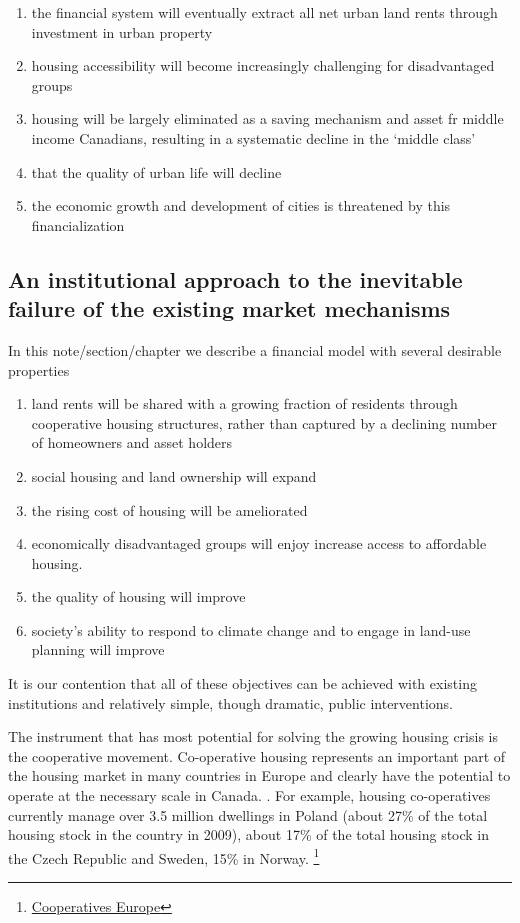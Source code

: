 \begin{enumerate}
\item the financial system will eventually extract all net urban land rents through investment in urban property
\item housing accessibility will become increasingly challenging for disadvantaged groups
\item housing will be largely eliminated as a saving mechanism and asset fr middle income Canadians,  resulting in a systematic decline in the `middle class'
\item that the quality of urban life will decline
\item the economic growth and development of cities is threatened by this financialization
\end{enumerate}



\subsection{An institutional approach to the inevitable failure of the existing market mechanisms}

 In this note/section/chapter we describe a financial model with several desirable properties
 
 \begin{enumerate}
     \item land rents will be shared with a growing fraction of residents through cooperative housing structures, rather than captured by a declining number of homeowners and asset holders
     \item social housing and land ownership will expand
     \item the rising cost of housing will be ameliorated
     \item economically disadvantaged groups will enjoy increase access to affordable housing.
     \item the quality of housing will improve
     \item society's ability to respond to climate change and to engage in land-use planning will improve     
 \end{enumerate}


 It is our contention that all of these objectives can be achieved with existing institutions and relatively simple, though dramatic, public interventions.

 The instrument that has most potential for solving the growing housing crisis is the cooperative movement. Co-operative housing represents an important part of the housing market in many countries in Europe and clearly have the potential to operate at the necessary scale in Canada. . For example, housing co-operatives currently manage over 3.5 million dwellings in Poland (about 27\% of the total housing stock in the country in 2009), about 17\% of the total housing stock in the Czech Republic and Sweden, 15\% in Norway.
 \footnote{\href{https://coopseurope.coop/cooperative-housing-key-model-sustainable-housing-europe-organised-cecodhas-housing/}{Cooperatives Europe}}

